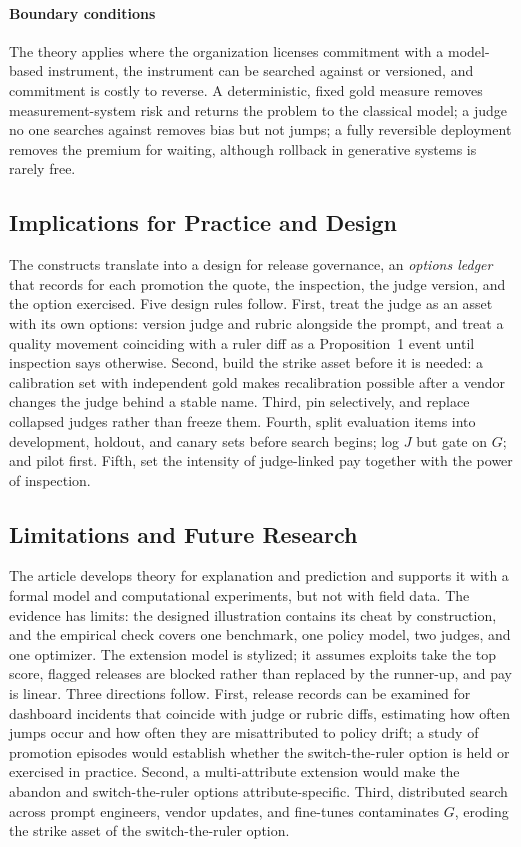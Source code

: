 \documentclass[acmsmall,screen,review]{acmart}
\theoremstyle{acmdefinition}
\begin{document}
\paragraph{Boundary conditions} The theory applies where the organization licenses commitment with a model-based instrument, the instrument can be searched against or versioned, and commitment is costly to reverse. A deterministic, fixed gold measure removes measurement-system risk and returns the problem to the classical model; a judge no one searches against removes bias but not jumps; a fully reversible deployment removes the premium for waiting, although rollback in generative systems is rarely free.

\subsection{Implications for Practice and Design}

The constructs translate into a design for release governance, an \emph{options ledger} that records for each promotion the quote, the inspection, the judge version, and the option exercised. Five design rules follow. First, treat the judge as an asset with its own options: version judge and rubric alongside the prompt, and treat a quality movement coinciding with a ruler diff as a Proposition~1 event until inspection says otherwise. Second, build the strike asset before it is needed: a calibration set with independent gold makes recalibration possible after a vendor changes the judge behind a stable name. Third, pin selectively, and replace collapsed judges rather than freeze them. Fourth, split evaluation items into development, holdout, and canary sets before search begins; log $J$ but gate on $G$; and pilot first. Fifth, set the intensity of judge-linked pay together with the power of inspection.

\subsection{Limitations and Future Research}

The article develops theory for explanation and prediction \citep{gregor2006} and supports it with a formal model and computational experiments, but not with field data. The evidence has limits: the designed illustration contains its cheat by construction, and the empirical check covers one benchmark, one policy model, two judges, and one optimizer. The extension model is stylized; it assumes exploits take the top score, flagged releases are blocked rather than replaced by the runner-up, and pay is linear. Three directions follow. First, release records can be examined for dashboard incidents that coincide with judge or rubric diffs, estimating how often jumps occur and how often they are misattributed to policy drift; a study of promotion episodes would establish whether the switch-the-ruler option is held or exercised in practice. Second, a multi-attribute extension would make the abandon and switch-the-ruler options attribute-specific. Third, distributed search across prompt engineers, vendor updates, and fine-tunes contaminates $G$, eroding the strike asset of the switch-the-ruler option.
\end{document}
